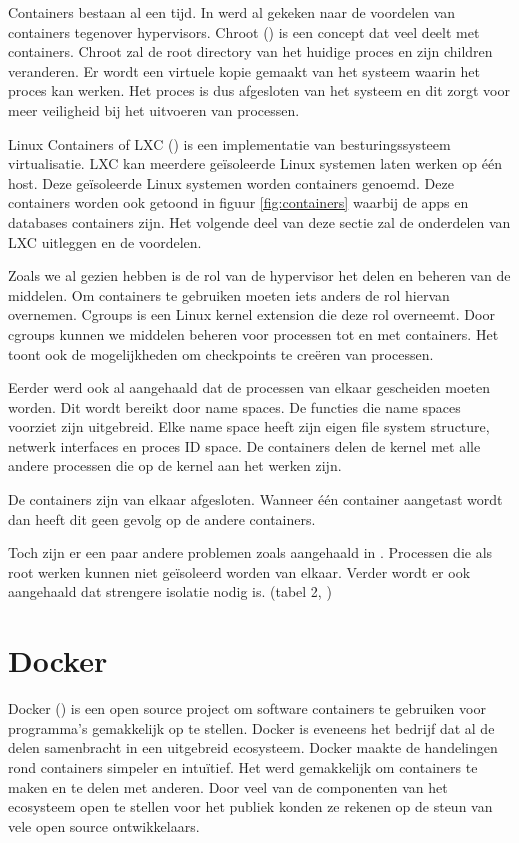 \documentclass[pdftex,a4paper,12pt,twoside]{report}
\begin{document}
Containers bestaan al een tijd. In \cite{soltesz_container-based_2007} werd al gekeken naar de voordelen van containers tegenover hypervisors. Chroot (\cite{Linux}) is een concept dat veel deelt met containers. Chroot zal de root directory van het huidige proces en zijn children veranderen. Er wordt een virtuele kopie gemaakt van het systeem waarin het proces kan werken. Het proces is dus afgesloten van het systeem en dit zorgt voor meer veiligheid bij het uitvoeren van processen.

Linux Containers of LXC (\cite{containers_linux_????}) is een implementatie van besturingssysteem virtualisatie. LXC kan meerdere geïsoleerde Linux systemen laten werken op één host. Deze geïsoleerde Linux systemen worden containers genoemd. Deze containers worden ook getoond in figuur \ref{fig:containers} waarbij de apps en databases containers zijn. Het volgende deel van deze sectie zal de onderdelen van LXC uitleggen en de voordelen.

Zoals we al gezien hebben is de rol van de hypervisor het delen en beheren van de middelen. Om containers te gebruiken moeten iets anders de rol hiervan overnemen. Cgroups is een Linux kernel extension die deze rol overneemt. Door cgroups kunnen we middelen beheren voor processen tot en met containers. Het toont ook de mogelijkheden om checkpoints te creëren van processen.

Eerder werd ook al aangehaald dat de processen van elkaar gescheiden moeten worden. Dit wordt bereikt door name spaces. De functies die name spaces voorziet zijn uitgebreid. Elke name space heeft zijn eigen file system structure, netwerk interfaces en proces ID space. De containers delen de kernel met alle andere processen die op de kernel aan het werken zijn.

De containers zijn van elkaar afgesloten. Wanneer één container aangetast wordt dan heeft dit geen gevolg op de andere containers.

Toch zijn er een paar andere problemen zoals aangehaald in \cite{madhavapeddy_jitsu:_2015}. Processen die als root werken kunnen niet geïsoleerd worden van elkaar. Verder wordt er ook aangehaald dat strengere isolatie nodig is. (tabel 2, \cite{madhavapeddy_jitsu:_2015})

\section{Docker}

Docker (\cite{docker_docker_2016}) is een open source project om software containers te gebruiken voor programma's gemakkelijk op te stellen. Docker is eveneens het bedrijf dat al de delen samenbracht in een uitgebreid ecosysteem. Docker maakte de handelingen rond containers simpeler en intuïtief. Het werd gemakkelijk om containers te maken en te delen met anderen. Door veel van de componenten van het ecosysteem open te stellen voor het publiek konden ze rekenen op de steun van vele open source ontwikkelaars.
\end{document}
